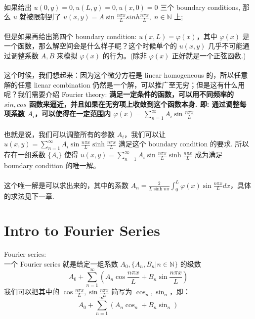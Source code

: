 \documentclass[12pt]{article}
\begin{document}
\paragraph{} 如果给出 $u(0,y) = 0, u(L,y) = 0, u(x,0) = 0$ 三个 boundary conditions, 那么 $u$ 就被限制到了 $u(x,y) = A \sin{\frac{n \pi x}{L}} sinh{\frac{n \pi x}{L}}, \; n\in \mathbb{N}$ 上;
\\\\但是如果再给出第四个 boundary condition: $u(x, L) = \varphi(x)$，其中 $\varphi(x)$ 是一个函数，那么解空间会是什么样子呢？这个时候单个的 $u(x,y)$ 几乎不可能通过调整系数 $A, B$ 来模拟 $\varphi(x)$ 的行为。(除非 $\varphi(x)$ 正好就是一个正弦函数.)
\\\\这个时候，我们想起来：因为这个微分方程是 linear homogeneous 的，所以任意解的任意 lienar combination 仍然是一个解，可以推广至无穷；但是这有什么用呢？我们需要介绍 Fourier theory: \textbf{满足一定条件的函数，可以用不同频率的 $sin, cos$ 函数来逼近，并且如果在无穷项上收敛到这个函数本身. 即: 通过调整每项系数 $A_i$，可以使得在一定范围内 $\varphi(x) = \sum_{n=1}^{\infty} A_i \sin{\frac{n \pi x}{L}}$}
\\\\也就是说，我们可以调整所有的参数 $A_i$，我们可以让 $u(x,y) = \sum_{n=1}^{\infty} A_i \sin \frac{n \pi x}{L} \sinh \frac{n \pi x}{L}$ 满足这个 boundary condition 的要求. 所以存在一组系数 $\{A_i\}$ 使得 $u(x,y) = \sum_{n=1}^{\infty} A_i \sin \frac{n \pi x}{L} \sinh \frac{n \pi x}{L}$  成为满足 boundary condition 的唯一解。
\\\\这个唯一解是可以求出来的，其中的系数 $A_n = \frac{2}{L \sinh{n \pi }} \int_0^L \varphi(x) \sin \frac{n \pi x}{L}dx$，具体的求法见下一章.



\section{Intro to Fourier Series}

\begin{defn}
    Fourier series:\\
    一个 Fourier series 就是给定一组系数 $A_0, \{A_n, B_n | n \in \mathbb{N}\}$ 的级数 $$
    A_0 + \sum_{n = 1} ^ \infty (A_n \cos \frac{n \pi x}{L} + B_n \sin \frac{n \pi x}{L}) 
    $$
    我们可以把其中的 $\cos \frac{n \pi x}{L}, \sin \frac{n \pi x}{L}$ 简写为 $\cos_n, \sin_n$，即：
    $$
    A_0 + \sum_{n = 1} ^ \infty (A_n \cos_n + B_n \sin _n)
    $$
\end{defn}
\end{document}
